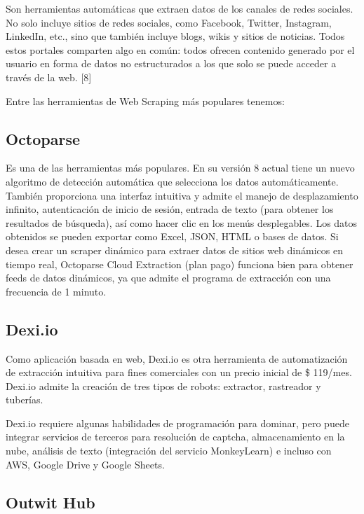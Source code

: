 \documentclass[twocolumn]{article}
\begin{document}
Son herramientas automáticas que extraen datos de los canales de redes sociales. No solo incluye sitios de redes sociales, como Facebook, Twitter, Instagram, LinkedIn, etc., sino que también incluye blogs, wikis y sitios de noticias. Todos estos portales comparten algo en común: todos ofrecen contenido generado por el usuario en forma de datos no estructurados a los que solo se puede acceder a través de la web. [8]

Entre las herramientas de Web Scraping más populares tenemos:

\subsection{Octoparse}

Es una de las herramientas más populares. En su versión 8 actual tiene un nuevo algoritmo de detección automática que selecciona los datos automáticamente. También proporciona una interfaz intuitiva y admite el manejo de desplazamiento infinito, autenticación de inicio de sesión, entrada de texto (para obtener los resultados de búsqueda), así como hacer clic en los menús desplegables. Los datos obtenidos se pueden exportar como Excel, JSON, HTML o bases de datos. Si desea crear un scraper dinámico para extraer datos de sitios web dinámicos en tiempo real, Octoparse Cloud Extraction (plan pago) funciona bien para obtener feeds de datos dinámicos, ya que admite el programa de extracción con una frecuencia de 1 minuto.

\subsection{Dexi.io}

Como aplicación basada en web, Dexi.io es otra herramienta de automatización de extracción intuitiva para fines comerciales con un precio inicial de \$ 119/mes. Dexi.io admite la creación de tres tipos de robots: extractor, rastreador y tuberías.

Dexi.io requiere algunas habilidades de programación para dominar, pero puede integrar servicios de terceros para resolución de captcha, almacenamiento en la nube, análisis de texto (integración del servicio MonkeyLearn) e incluso con AWS, Google Drive y Google Sheets.

\subsection{Outwit Hub}
\end{document}
